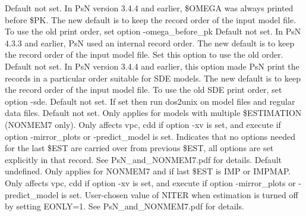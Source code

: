 \begin{optionlist}
Default not set. In PsN version 3.4.4 and earlier, \$OMEGA was always printed before \$PK. The new default is to keep the record order of the input model file. To use the old print order, set option -omega\_before\_pk
\nextopt
{}
Default not set. In PsN 4.3.3 and earlier, PsN used an internal record order. The new default is to keep the record order of the input model file. Set this option to use the old order.
\nextopt
{}
Default not set. In PsN version 3.4.4 and earlier, this option made PsN print the records
in a particular order suitable for SDE models.
The new default is to keep the record order of the input model file. To use the old SDE print order, 
set option -sde.
\nextopt
{}
Default not set. If set then run dos2unix on model files and regular data files.
\nextopt
{}
Default not set. Only applies for models with multiple \$ESTIMATION (NONMEM7 only). 
Only affects vpc,  cdd if option -xv is set, and execute if option -mirror\_plots or
-predict\_model is set. Indicates that no options needed for the last \$EST 
are carried over from previous \$EST, all options are set explicitly in that record. See PsN\_and\_NONMEM7.pdf 
for details. 
\nextopt
{}
Default undefined. Only applies for NONMEM7 and if last \$EST is IMP or IMPMAP. 
Only affects vpc,  cdd if option -xv is set, and execute if option -mirror\_plots or -predict\_model is set. 
User-chosen value of NITER when estimation is turned off by setting EONLY=1. See PsN\_and\_NONMEM7.pdf for details. 
\nextopt
\end{optionlist}
